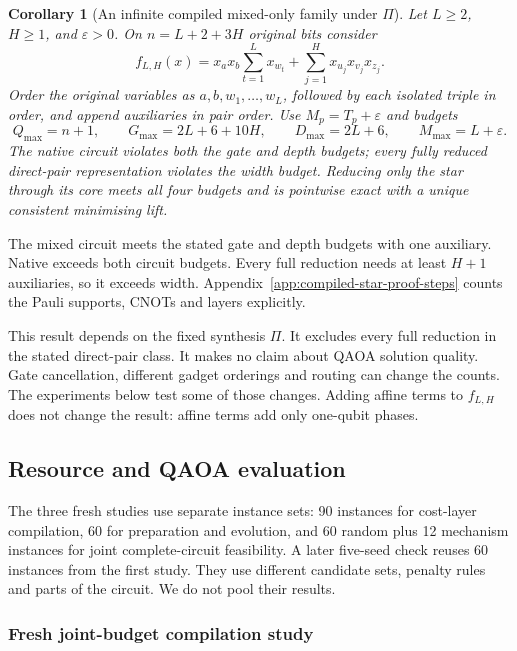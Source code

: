 \documentclass[a4paper,onecolumn,11pt,unpublished]{quantumarticle}
\newtheorem{corollary}[corollary]{Corollary}
\theoremstyle{remark}
\begin{document}
\begin{corollary}[An infinite compiled mixed-only family under $\Pi$]
\label{cor:compiled-star-isolated}
Let $L\geq2$, $H\geq1$, and $\varepsilon>0$. On
$n=L+2+3H$ original bits consider
\[
 f_{L,H}(x)=x_ax_b\sum_{t=1}^{L}x_{w_t}
              +\sum_{j=1}^{H}x_{u_j}x_{v_j}x_{z_j}.
\]
Order the original variables as $a,b,w_1,\ldots,w_L$, followed by each
isolated triple in order, and append auxiliaries in pair order.
Use $M_p=T_p+\varepsilon$ and budgets
\begin{equation}
 Q_{\max}=n+1,\qquad G_{\max}=2L+6+10H,\qquad
 D_{\max}=2L+6,\qquad M_{\max}=L+\varepsilon.
 \label{eq:compiled-mixed-only-budgets}
\end{equation}
The native circuit violates both the gate and depth budgets; every fully
reduced direct-pair representation violates the width budget. Reducing only
the star through its core meets all four budgets and is pointwise exact
with a unique consistent minimising lift.
\end{corollary}

The mixed circuit meets the stated gate and depth budgets with one auxiliary.
Native exceeds both circuit budgets. Every full reduction needs at least
$H+1$ auxiliaries, so it exceeds width.
Appendix~\ref{app:compiled-star-proof-steps} counts the Pauli supports,
CNOTs and layers explicitly.

This result depends on the fixed synthesis $\Pi$. It excludes every full
reduction in the stated direct-pair class. It makes no claim about QAOA
solution quality. Gate cancellation, different gadget orderings and routing
can change the counts. The experiments below test some of those changes.
Adding affine terms to $f_{L,H}$ does not change the result: affine terms
add only one-qubit phases.

\subsection{Resource and QAOA evaluation}
\label{sec:new-evaluation}
The three fresh studies use separate instance sets: 90 instances for cost-layer
compilation, 60 for preparation and evolution, and 60 random plus 12
mechanism instances for joint complete-circuit feasibility. A later five-seed
check reuses 60 instances from the first study. They use different
candidate sets, penalty rules and parts of the circuit. We do not pool their
results.
\subsubsection{Fresh joint-budget compilation study}
\label{sec:fresh-compiled}
\end{document}
